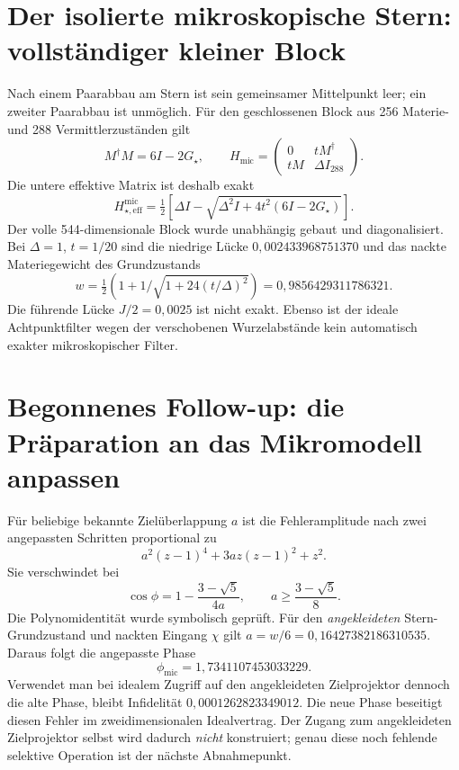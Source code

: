 \section{Der isolierte mikroskopische Stern: vollständiger kleiner Block}
Nach einem Paarabbau am Stern ist sein gemeinsamer Mittelpunkt leer; ein zweiter Paarabbau ist unmöglich. Für den geschlossenen Block aus 256 Materie- und 288 Vermittlerzuständen gilt
\begin{equation}
M^\dagger M=6I-2G_\star,\qquad
H_{\mathrm{mic}}=\begin{pmatrix}0&tM^\dagger\\tM&\Delta I_{288}\end{pmatrix}.
\end{equation}
Die untere effektive Matrix ist deshalb exakt
\begin{equation}
H_{\star,\mathrm{eff}}^{\mathrm{mic}}
=\tfrac12[\Delta I-\sqrt{\Delta^2I+4t^2(6I-2G_\star)}].
\end{equation}
Der volle 544-dimensionale Block wurde unabhängig gebaut und diagonalisiert. Bei $\Delta=1$, $t=1/20$ sind die niedrige Lücke $0{,}002433968751370$ und das nackte Materiegewicht des Grundzustands
\begin{equation}
w=\tfrac12(1+1/\sqrt{1+24(t/\Delta)^2})=0{,}9856429311786321.
\end{equation}
Die führende Lücke $J/2=0{,}0025$ ist nicht exakt. Ebenso ist der ideale Achtpunktfilter wegen der verschobenen Wurzelabstände kein automatisch exakter mikroskopischer Filter.

\section{Begonnenes Follow-up: die Präparation an das Mikromodell anpassen}
Für beliebige bekannte Zielüberlappung $a$ ist die Fehleramplitude nach zwei angepassten Schritten proportional zu
\begin{equation}
a^2(z-1)^4+3az(z-1)^2+z^2.
\end{equation}
Sie verschwindet bei
\begin{equation}
\cos\phi=1-\frac{3-\sqrt5}{4a},\qquad
a\ge\frac{3-\sqrt5}{8}.
\label{eq:matched-general}
\end{equation}
Die Polynomidentität wurde symbolisch geprüft. Für den \emph{angekleideten} Stern-Grundzustand und nackten Eingang $\chi$ gilt $a=w/6=0{,}16427382186310535$. Daraus folgt die angepasste Phase
\begin{equation}
\phi_{\mathrm{mic}}=1{,}7341107453033229.
\end{equation}
Verwendet man bei idealem Zugriff auf den angekleideten Zielprojektor dennoch die alte Phase, bleibt Infidelität $0{,}0001262823349012$. Die neue Phase beseitigt diesen Fehler im zweidimensionalen Idealvertrag. Der Zugang zum angekleideten Zielprojektor selbst wird dadurch \emph{nicht} konstruiert; genau diese noch fehlende selektive Operation ist der nächste Abnahmepunkt.

